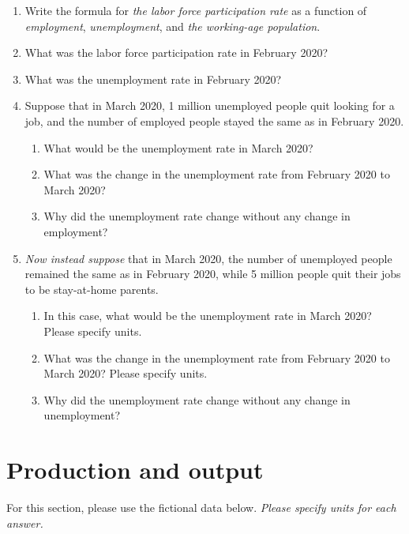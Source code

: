 \documentclass{assignment}
\begin{document}
\clearpage

\begin{enumerate}
\item Write the formula for \emph{the labor force participation rate} as a function of \emph{employment}, \emph{unemployment}, and \emph{the working-age population}.

\vfill

\item What was the labor force participation rate in February 2020?
\vfill
\item What was the unemployment rate in February 2020?
\vfill
\item Suppose that in March 2020, 1 million unemployed people quit looking for a job, and the number of employed people stayed the same as in February 2020.

\begin{enumerate}
\item What would be the unemployment rate in March 2020?
\vfill
\item What was the change in the unemployment rate from February 2020 to March 2020?
\vfill
\item Why did the unemployment rate change without any change in employment?
\vfill
\end{enumerate}

\clearpage

\item \emph{Now instead suppose} that in March 2020, the number of unemployed people remained the same as in February 2020, while 5 million people quit their jobs to be stay-at-home parents.

\begin{enumerate}
\item In this case, what would be the unemployment rate in March 2020? Please specify units.
\vfill
\item What was the change in the unemployment rate from February 2020 to March 2020? Please specify units.
\vfill
\item Why did the unemployment rate change without any change in unemployment?
\vfill
\vfill
\end{enumerate}
\end{enumerate}

\section{Production and output}

For this section, please use the fictional data below. \emph{Please specify units for each answer.}
\end{document}
